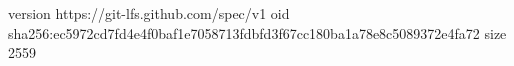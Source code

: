 version https://git-lfs.github.com/spec/v1
oid sha256:ec5972cd7fd4e4f0baf1e7058713fdbfd3f67cc180ba1a78e8c5089372e4fa72
size 2559
